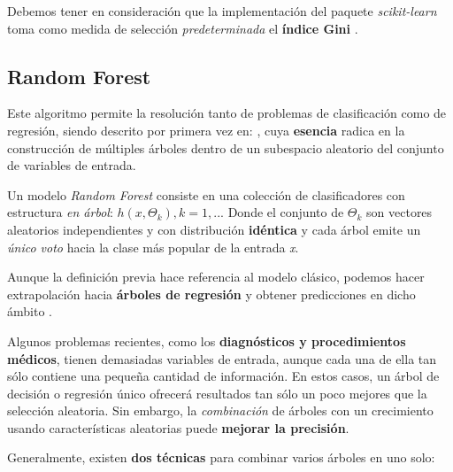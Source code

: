 Debemos tener en consideración que la implementación del paquete \textit{scikit-learn} toma como medida de selección \textit{predeterminada} el \textbf{índice Gini} \cite{Pedregosa2011Scikit-learn:Python}.


\subsection{Random Forest}

Este algoritmo permite la resolución tanto de problemas de clasificación como de regresión, siendo descrito por primera vez en: \cite{Ho1995RandomForests}, cuya \textbf{esencia} radica en la construcción de múltiples árboles dentro de un subespacio aleatorio del conjunto de variables de entrada.

Un modelo \textit{Random Forest} consiste en una colección de clasificadores con estructura \textit{en árbol}: 
\({h(x,\Theta_{k}), k = 1, ...}\)
Donde el conjunto de 
\(\Theta_{k}\) son vectores aleatorios independientes y con distribución \textbf{idéntica} y cada árbol emite un \textit{único voto} hacia la clase más popular de la entrada \textit{x}\cite{Breiman2001RandomForests}.

Aunque la definición previa hace referencia al modelo clásico, podemos hacer extrapolación hacia \textbf{árboles de regresión} y obtener predicciones en dicho ámbito \cite{Belyadi2021SupervisedLearning}.


Algunos problemas recientes, como los \textbf{diagnósticos y procedimientos médicos}, tienen demasiadas variables de entrada, aunque cada una de ella tan sólo contiene una pequeña cantidad de información. En estos casos, un árbol de decisión o regresión único ofrecerá resultados tan sólo un poco mejores que la selección aleatoria. Sin embargo, la \textit{combinación} de árboles con un crecimiento usando características aleatorias puede \textbf{mejorar la precisión}\cite{Breiman2001RandomForests}.

Generalmente, existen \textbf{dos técnicas} para combinar varios árboles en uno solo\cite{Belyadi2021SupervisedLearning}:

